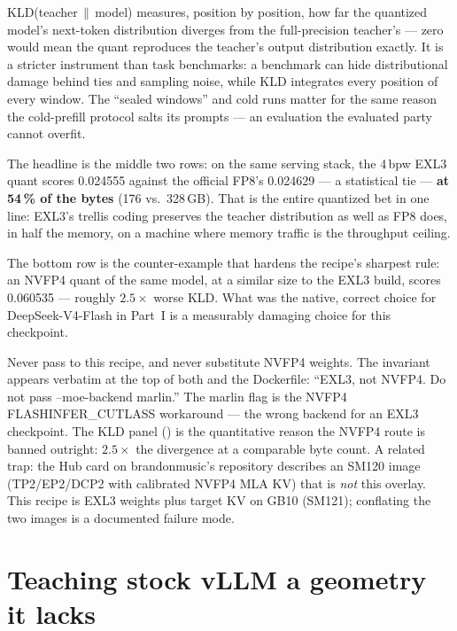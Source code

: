\begin{hbnote}
KLD(teacher\,$\|$\,model) measures, position by position, how far the
quantized model's next-token distribution diverges from the full-precision
teacher's --- zero would mean the quant reproduces the teacher's output
distribution exactly. It is a stricter instrument than task benchmarks:
a benchmark can hide distributional damage behind ties and sampling noise,
while KLD integrates every position of every window. The ``sealed windows''
and cold runs matter for the same reason the cold-prefill protocol salts its
prompts --- an evaluation the evaluated party cannot overfit.
\end{hbnote}

The headline is the middle two rows: on the same serving stack, the 4\,bpw
EXL3 quant scores 0.024555 against the official FP8's 0.024629 --- a
statistical tie --- \textbf{at 54\,\% of the bytes} (176 vs.\ 328\,GB). That
is the entire quantized bet in one line: EXL3's trellis coding preserves the
teacher distribution as well as FP8 does, in half the memory, on a machine
where memory traffic is the throughput ceiling.

The bottom row is the
counter-example that hardens the recipe's sharpest rule: an NVFP4 quant of
the same model, at a similar size to the EXL3 build, scores 0.060535 ---
roughly $2.5\times$ worse KLD. What was the native, correct choice for
DeepSeek-V4-Flash in Part~I is a measurably damaging choice for this
checkpoint.

\begin{hbwarning}
Never pass  to this recipe, and never substitute
NVFP4 weights. The invariant appears verbatim at the top of both
 and the Dockerfile: ``EXL3, not NVFP4. Do not pass
--moe-backend marlin.'' The marlin flag is the NVFP4 FLASHINFER\_CUTLASS
workaround --- the wrong backend for an EXL3 checkpoint. The KLD panel
() is the quantitative reason the NVFP4 route is banned
outright: $2.5\times$ the divergence at a comparable byte count. A related trap:
the Hub card on brandonmusic's repository describes an SM120 image
(TP2/EP2/DCP2 with calibrated NVFP4 MLA KV) that is \emph{not} this overlay.
This recipe is EXL3 weights plus  target KV on GB10
(SM121); conflating the two images is a documented failure mode.
\end{hbwarning}

\section{Teaching stock vLLM a geometry it lacks}
\label{sec:qbet-geometry}

